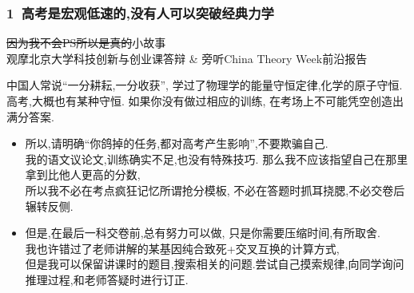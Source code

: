 \documentclass[10pt]{beamer}
\begin{document}
\begin{frame}
	\frametitle{1\ 高考是宏观低速的,没有人可以突破经典力学}

	\begin{example}
		\sout{因为我不会PS所以是真的}小故事\\
		观摩北京大学科技创新与创业课答辩 \& 旁听China Theory Week前沿报告
	\end{example}

	\pause{}

	中国人常说``一分耕耘,一分收获'', 学过了物理学的能量守恒定律,化学的原子守恒.\\
	高考,大概也有某种守恒. 如果你没有做过相应的训练, 在考场上不可能凭空创造出满分答案.\\

	\pause{}
	\vspace{2em}

	\begin{itemize}
		\item 所以,请明确``你鸽掉的任务,都对高考产生影响'',不要欺骗自己.\\
		我的语文议论文,训练确实不足,也没有特殊技巧. 那么我不应该指望自己在那里拿到比他人更高的分数,\\
		所以我不必在考点疯狂记忆所谓抢分模板, 不必在答题时抓耳挠腮,不必交卷后辗转反侧.\\

		\item 但是,在最后一科交卷前,总有努力可以做, 只是你需要压缩时间,有所取舍.\\
		我也许错过了老师讲解的某基因纯合致死+交叉互换的计算方式,\\
		但是我可以保留讲课时的题目,搜索相关的问题.尝试自己摸索规律,向同学询问推理过程,和老师答疑时进行订正.\\
	\end{itemize}
\end{frame}
\end{document}
